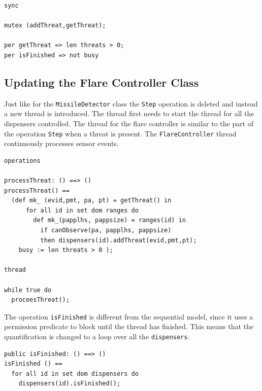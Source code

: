 \documentclass{overturerepchap}
\begin{document}
\begin{lstlisting}
sync

mutex (addThreat,getThreat);

per getThreat => len threats > 0;
per isFinished => not busy
\end{lstlisting}

\subsection{Updating the Flare Controller Class}

%

Just like for the \texttt{MissileDetector} class the \texttt{Step} operation
is deleted and instead a new thread is introduced. The thread first needs
to start the thread for all the dispensers controlled.
The thread for the flare controller is similar to the part of the operation
\texttt{Step} when a threat is present. The \texttt{FlareController} thread
continuously processes sensor events. 

\begin{lstlisting}
operations

processThreat: () ==> ()
processThreat() ==
  (def mk_ (evid,pmt, pa, pt) = getThreat() in
      for all id in set dom ranges do
        def mk_(papplhs, pappsize) = ranges(id) in
          if canObserve(pa, papplhs, pappsize)
          then dispensers(id).addThreat(evid,pmt,pt);
    busy := len threats > 0 );

thread

while true do
  proceesThreat();
\end{lstlisting}

The operation \texttt{isFinished} is different from the sequential
model, since it uses a permission predicate to block until the thread
has finished. This means that the {\bf{}} quantification is
changed to a loop over all the \texttt{dispensers}.

\begin{lstlisting}
public isFinished: () ==> ()
isFinished () ==
  for all id in set dom dispensers do
    dispensers(id).isFinished();
\end{lstlisting}
\end{document}
